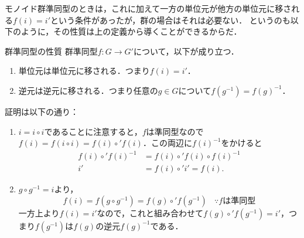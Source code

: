 \documentclass[11pt,a4paper]{jsarticle}
\begin{document}
モノイド群準同型のときは，これに加えて一方の単位元が他方の単位元に移される$f(i) = i'$という条件があったが，群の場合はそれは必要ない．
というのも以下のように，その性質は上の定義から導くことができるからだ．

\begin{prop}{群準同型の性質}{}
 群準同型$f:G \to G'$について，以下が成り立つ．
 \begin{enumerate}
  \item 単位元は単位元に移される．つまり$f(i) = i'$．
  \item 逆元は逆元に移される．つまり任意の$g \in G$について$f(g^{-1}) = f(g)^{-1}$．
 \end{enumerate}
\end{prop}
証明は以下の通り：
 \begin{enumerate}
  \item $i = i \circ i$であることに注意すると，$f$は準同型なので$f(i) = f(i \circ i) = f(i) \circ' f(i)$．この両辺に$f(i)^{-1}$をかけると
	\begin{align*}
	 f(i) \circ' f(i)^{-1} &= f(i) \circ' f(i) \circ f(i)^{-1} \\ 
	 i' &=   f(i) \circ' i' = f(i).
	\end{align*}
  \item $g \circ g^{-1} = i$より，
	\[ f(i) = f(g \circ g^{-1}) = f(g) \circ' f(g^{-1}) \ \ \ \ \because f\text{は準同型}	\]
	一方上より$f(i) = i'$なので，これと組み合わせて$f(g) \circ' f(g^{-1}) = i'$，つまり$f(g^{-1})$は$f(g)$の逆元$f(g)^{-1}$である．
 \end{enumerate}
 
\end{document}
